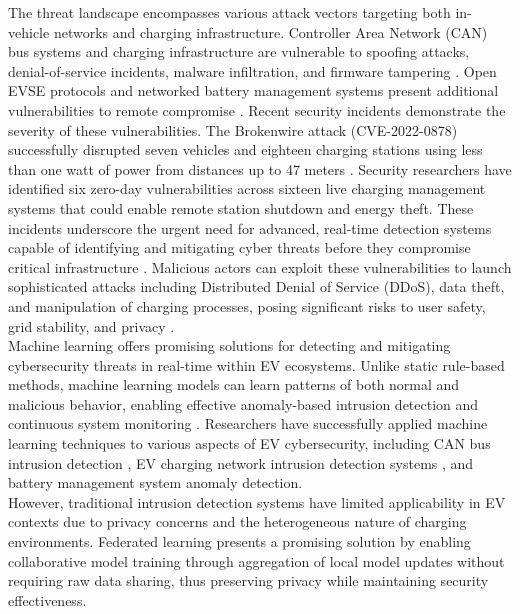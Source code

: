 The threat landscape encompasses various attack vectors targeting both in-vehicle networks and charging infrastructure. Controller Area Network (CAN) bus systems and charging infrastructure are vulnerable to spoofing attacks, denial-of-service incidents, malware infiltration, and firmware tampering \cite{rai2025securing, almadhor2025transfer}. Open EVSE protocols and networked battery management systems present additional vulnerabilities to remote compromise \cite{lipu2023artificial}. Recent security incidents demonstrate the severity of these vulnerabilities. The Brokenwire attack (CVE-2022-0878) successfully disrupted seven vehicles and eighteen charging stations using less than one watt of power from distances up to 47 meters \cite{kohler2022brokenwire}. Security researchers have identified six zero-day vulnerabilities across sixteen live charging management systems that could enable remote station shutdown and energy theft. These incidents underscore the urgent need for advanced, real-time detection systems capable of identifying and mitigating cyber threats before they compromise critical infrastructure \cite{johnson2022review}. Malicious actors can exploit these vulnerabilities to launch sophisticated attacks including Distributed Denial of Service (DDoS), data theft, and manipulation of charging processes, posing significant risks to user safety, grid stability, and privacy \cite{kumar2025machine, alcaraz2017ocpp}. \\

Machine learning offers promising solutions for detecting and mitigating cybersecurity threats in real-time within EV ecosystems. Unlike static rule-based methods, machine learning models can learn patterns of both normal and malicious behavior, enabling effective anomaly-based intrusion detection and continuous system monitoring \cite{sani2022privacy, mohamed2023artificial}. Researchers have successfully applied machine learning techniques to various aspects of EV cybersecurity, including CAN bus intrusion detection \cite{bari2023intrusion, rai2025securing}, EV charging network intrusion detection systems \cite{almadhor2025transfer, makhmudov2025online}, and battery management system anomaly detection. \\

However, traditional intrusion detection systems have limited applicability in EV contexts due to privacy concerns and the heterogeneous nature of charging environments. Federated learning presents a promising solution by enabling collaborative model training through aggregation of local model updates without requiring raw data sharing, thus preserving privacy while maintaining security effectiveness. \\

